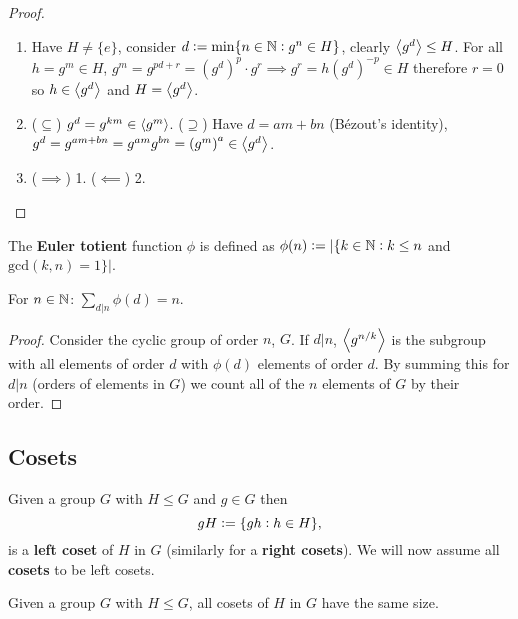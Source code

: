 \documentclass[../Year1.tex]{subfiles}
\begin{document}
\begin{proof}
    \begin{enumerate}
        \item  Have $H\neq\{e\}$, consider $d:=\min\{n\in\mathbb{N}:g^n\in H\}$, clearly $\left\langle g^d \right\rangle\leq H$. For all $h=g^m\in H$, $g^m=g^{pd+r}={(g^d)}^p\cdot g^r\implies g^r=h{(g^d)}^{-p}\in H$ therefore $r=0$ so $h\in\left\langle g^d \right\rangle$ and $H=\left\langle g^d \right\rangle$.
        \item ($\subseteq$) $g^d=g^{km}\in\left\langle g^m \right\rangle$. ($\supseteq$) Have $d=am+bn$ (Bézout's identity), $g^d = g^{am+bn}=g^{am}g^{bn}={(g^m)}^a\in\left\langle g^d \right\rangle$.
        \item ($\implies$) 1. ($\impliedby$) 2.
    \end{enumerate}
\end{proof}

\begin{definition}
    The \textbf{Euler totient} function $\phi$ is defined as $\phi(n):=|\{k\in\mathbb{N}: k\leq n$ and $\text{gcd}(k,n)=1\}|$.
\end{definition}

\vspace{-5pt}

\begin{corollary}
    For $n\in\mathbb{N}$: \hfil $\displaystyle\sum_{d|n}\phi(d) = n$.
\end{corollary}

\vspace{-15pt}

\begin{proof}
    Consider the cyclic group of order $n$, $G$. If $d|n$, $\left\langle g^{n/k} \right\rangle$ is the subgroup with all elements of order $d$ with $\phi(d)$ elements of order $d$. By summing this for $d|n$ (orders of elements in $G$) we count all of the $n$ elements of $G$ by their order.
\end{proof}

\subsection{Cosets}

\begin{definition}[Coset]
    Given a group $G$ with $H\leq G$ and $g\in G$ then \[
    gH := \{gh: h\in H\}
    \textcolor{black}{,}
    \]
    is a \textbf{left coset} of $H$ in $G$ (similarly for a \textbf{right cosets}). We will now assume all \textbf{cosets} to be left cosets.
\end{definition}

\begin{lemma}
    Given a group $G$ with $H\leq G$, all cosets of $H$ in $G$ have the same size.
\end{lemma}
\end{document}
